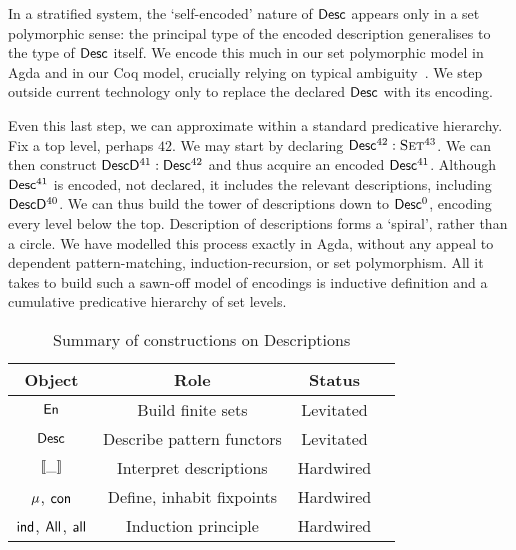 
In a stratified system, the `self-encoded' nature of $\Desc$ appears
only in a set polymorphic sense: the principal type of the encoded
description generalises to the type of $\Desc$ itself. We encode this
much in our set polymorphic model in Agda and in our Coq model,
crucially relying on typical ambiguity~\cite{harper:implicit-universe}.
We step outside current technology only to replace the declared $\Desc$
with its encoding.

Even this last step, we can approximate within a standard predicative
hierarchy. Fix a top level, perhaps \(42\). We may start by declaring
$\Desc^{42}:\Set^{43}$. We can then construct $\DescD^{41}:\Desc^{42}$
and thus acquire an encoded $\Desc^{41}$. Although $\Desc^{41}$ is
encoded, not declared, it includes the relevant descriptions,
including $\DescD^{40}$. We can thus build the tower of descriptions
down to $\Desc^0$, encoding every level below the top.  Description of
descriptions forms a `spiral', rather than a circle. We have modelled
this process exactly in Agda, without any appeal to dependent
pattern-matching, induction-recursion, or set polymorphism. All it
takes to build such a sawn-off model of encodings is inductive
definition and a cumulative predicative hierarchy of set levels.

\begin{table}

{
\begin{center}
\begin{tabular}{|c|c|c|c|}
\hline
Object                & Role                        & Status \\
\hline
\hline
$\EnumU$              & Build finite sets           & Levitated \\
\hline
$\Desc$               & Describe pattern functors   & Levitated \\
\hline
$\SYMBdescop{\_}$     & Interpret descriptions      & Hardwired \\
\hline
$\SYMBMu$, $\SYMBCon$ & Define, inhabit fixpoints   & Hardwired \\
\hline
$\SYMBind$, $\SYMBAll$, $\SYMBall$  
                      & Induction principle         & Hardwired \\
\hline
\end{tabular}
\end{center}
}

\caption{Summary of constructions on Descriptions}
\label{tab:sumup-operators}

\end{table}
